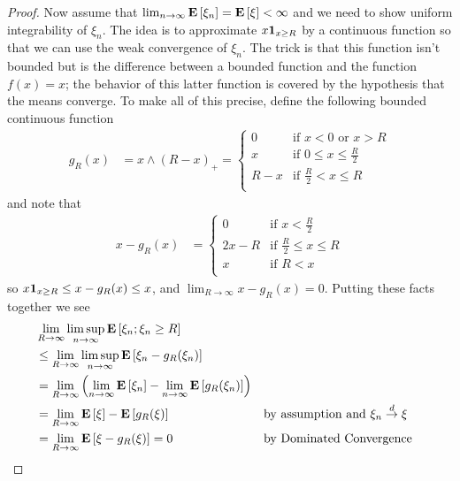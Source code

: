 \begin{proof}
Now assume that $\lim_{n \to \infty} \textbf{E}\left[\xi_n\right]  =
\textbf{E}\left[\xi\right] < \infty$ and we need to show uniform integrability
of $\xi_n$.  The idea is to approximate $x \textbf{1}_{x\geq R}$
by a continuous function so that we can use the weak convergence of
$\xi_n$.  The trick is that this function isn't bounded but is the
difference between a bounded function and the function $f(x) =x$; the
behavior of this latter function is covered by the hypothesis that the
means converge.  To make all of this precise, define the following bounded continuous function
\begin{align*}
g_R(x) &= x \wedge (R - x)_+ = \begin{cases}
0 & \text{if $x<0$ or $x > R$} \\
x & \text{if $0 \leq x \leq \frac{R}{2}$} \\
R - x & \text{if $\frac{R}{2} < x \leq R$} \\
\end{cases}
\end{align*}
and note that 
\begin{align*}
x - g_R(x) &= \begin{cases}
0 & \text{if $x<\frac{R}{2}$} \\
2x -R & \text{if $\frac{R}{2} \leq x \leq R$} \\
x & \text{if $R < x$} \\
\end{cases}
\end{align*}
so $x \textbf{1}_{x \geq R}  \leq x - g_R(x) \leq x$, and $\lim_{R
  \to \infty}  x - g_R(x) = 0$.  Putting these facts together we see
\begin{align*}
&\lim_{R \to \infty} \limsup_{n \to \infty} \textbf{E}\left[\xi_n ; \xi_n
  \geq R\right] \\
&\leq \lim_{R \to \infty} \limsup_{n \to \infty}
\textbf{E}\left[\xi_n - g_R(\xi_n)\right] \\
&= \lim_{R \to \infty} \left (\lim_{n \to \infty}
\textbf{E}\left[\xi_n\right] - \lim_{n \to \infty} \textbf{E}\left[g_R(\xi_n)\right] \right) \\
&=\lim_{R \to \infty} \textbf{E}\left[\xi\right] -  \textbf{E}\left[g_R(\xi)\right] & &
\text{by assumption and $\xi_n \overset{d}\to \xi$}\\
&=\lim_{R \to \infty} \textbf{E}\left[\xi - g_R(\xi)\right] = 0 & & \text{by
  Dominated Convergence}
\end{align*}
\end{proof}

